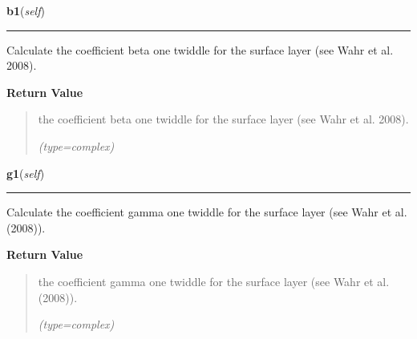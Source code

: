     \label{SatStress:SatStress:StressDef:b1}

    \vspace{0.5ex}

\hspace{.8\funcindent}\begin{boxedminipage}{\funcwidth}

    \raggedright \textbf{b1}(\textit{self})

    \vspace{-1.5ex}

    \rule{\textwidth}{0.5\fboxrule}
\setlength{\parskip}{2ex}
    Calculate the coefficient beta one twiddle for the surface layer (see 
    Wahr et al. 2008).

\setlength{\parskip}{1ex}
      \textbf{Return Value}
    \vspace{-1ex}

      \begin{quote}
      the coefficient beta one twiddle for the surface layer (see Wahr et 
      al. 2008).

      {\it (type=complex)}

      \end{quote}

    \end{boxedminipage}

    \label{SatStress:SatStress:StressDef:g1}

    \vspace{0.5ex}

\hspace{.8\funcindent}\begin{boxedminipage}{\funcwidth}

    \raggedright \textbf{g1}(\textit{self})

    \vspace{-1.5ex}

    \rule{\textwidth}{0.5\fboxrule}
\setlength{\parskip}{2ex}
    Calculate the coefficient gamma one twiddle for the surface layer (see 
    Wahr et al. (2008)).

\setlength{\parskip}{1ex}
      \textbf{Return Value}
    \vspace{-1ex}

      \begin{quote}
      the coefficient gamma one twiddle for the surface layer (see Wahr et 
      al. (2008)).

      {\it (type=complex)}

      \end{quote}

    \end{boxedminipage}

